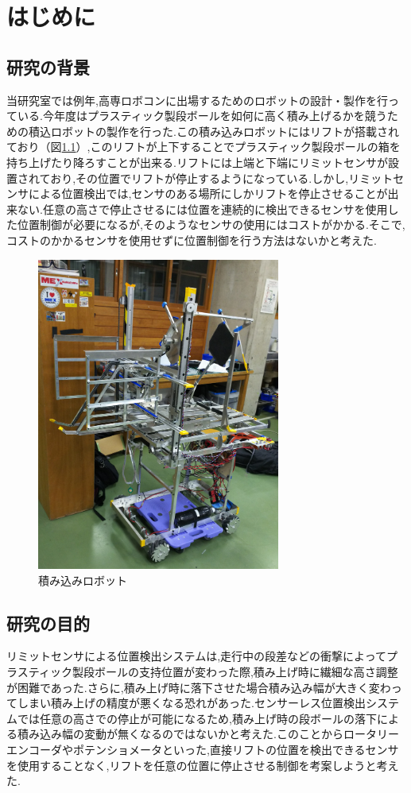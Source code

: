 \chapter{はじめに}

\section{研究の背景}
当研究室では例年,高専ロボコンに出場するためのロボットの設計・製作を行っている.今年度はプラスティック製段ボールを如何に高く積み上げるかを競うための積込ロボットの製作を行った.この積み込みロボットにはリフトが搭載されており（図\ref{fig:robot}）,このリフトが上下することでプラスティック製段ボールの箱を持ち上げたり降ろすことが出来る.リフトには上端と下端にリミットセンサが設置されており,その位置でリフトが停止するようになっている.しかし,リミットセンサによる位置検出では,センサのある場所にしかリフトを停止させることが出来ない.任意の高さで停止させるには位置を連続的に検出できるセンサを使用した位置制御が必要になるが,そのようなセンサの使用にはコストがかかる.そこで,コストのかかるセンサを使用せずに位置制御を行う方法はないかと考えた.

\begin{figure}[htbp]
  \begin{center}
    \includegraphics[width=80mm]{img/robot.JPG}
    \end{center}
  \caption{積み込みロボット}
 \label{fig:robot}
\end{figure}

\section{研究の目的}
リミットセンサによる位置検出システムは,走行中の段差などの衝撃によってプラスティック製段ボールの支持位置が変わった際,積み上げ時に繊細な高さ調整が困難であった.さらに,積み上げ時に落下させた場合積み込み幅が大きく変わってしまい積み上げの精度が悪くなる恐れがあった.センサーレス位置検出システムでは任意の高さでの停止が可能になるため,積み上げ時の段ボールの落下による積み込み幅の変動が無くなるのではないかと考えた.このことからロータリーエンコーダやポテンショメータといった,直接リフトの位置を検出できるセンサを使用することなく,リフトを任意の位置に停止させる制御を考案しようと考えた.


